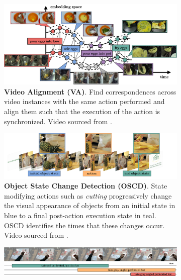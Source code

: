 \begin{figure}[t]
\begin{minipage}{0.49\textwidth}
\begin{subfigure}{\linewidth}
\label{fig:states::reasoning}
\end{subfigure}
\end{minipage}
\hfill
\begin{minipage}{0.49\textwidth} 
\addtocounter{subfigure}{-1} 
\begin{subfigure}{\linewidth}
\includegraphics[width=\linewidth]{figs/states/states-alignment.pdf}
\caption{\textbf{Video Alignment (VA)}. Find correspondences across video instances with the same action performed and align them such that the execution of the action is synchronized. Video sourced from . \vspace{.5em}}
\label{fig:states::align}
\end{subfigure}
\hfill
\begin{subfigure}{\linewidth}
\includegraphics[width=\linewidth]{figs/states/states-object_state_change.pdf}
\caption{\textbf{Object State Change Detection (OSCD)}. State modifying actions such as \textit{cutting} progressively change the visual appearance of objects from an initial state in \textcolor{babyblue}{blue} to a final post-action execution state in \textcolor{pastelteal}{teal}. OSCD identifies the times that these changes occur. Video sourced from . \vspace{0.5em}}
\label{fig:states::oscd}
\end{subfigure}
\end{minipage} %
\begin{subfigure}{\linewidth}
\includegraphics[width=\linewidth]{figs/states/states-active_object.pdf}

\end{subfigure}
\end{figure}
